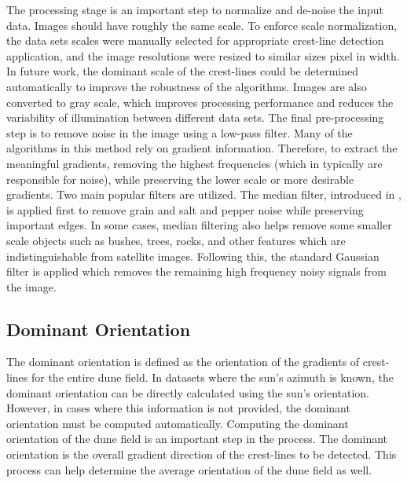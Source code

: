 The processing stage is an important step to normalize and de-noise the input data. Images should have roughly the same scale. To enforce scale normalization, the data sets scales were manually selected for appropriate crest-line detection application, and the image resolutions were resized to similar sizes pixel in width. In future work, the dominant scale of the crest-lines could be determined automatically to improve the robustness of the algorithms. Images are also converted to gray scale, which improves processing performance and reduces the variability of illumination between different data sets. The final pre-processing step is to remove noise in the image using a low-pass filter. Many of the algorithms in this method rely on gradient information. Therefore, to extract the meaningful gradients, removing the highest frequencies (which in typically are responsible for noise), while preserving the lower scale or more desirable gradients. Two main popular filters are utilized. The median filter, introduced in \cite{huang_median_filtering_algorithm}, is applied first to remove grain and salt and pepper noise while preserving important edges. In some cases, median filtering also helps remove some smaller scale objects such as bushes, trees, rocks, and other features which are indistinguishable from satellite images. Following this, the standard Gaussian filter is applied which removes the remaining high frequency noisy signals from the image.

\subsection{Dominant Orientation} \label{subsec:dominant_orientation}
The dominant orientation is defined as the orientation of the gradients of crest-lines for the entire dune field. In datasets where the sun's azimuth is known, the dominant orientation can be directly calculated using the sun's orientation. However, in cases where this information is not provided, the dominant orientation must be computed automatically. Computing the dominant orientation of the dune field is an important step in the process. The dominant orientation is the overall gradient direction of the crest-lines to be detected. This process can help determine the average orientation of the dune field as well.

